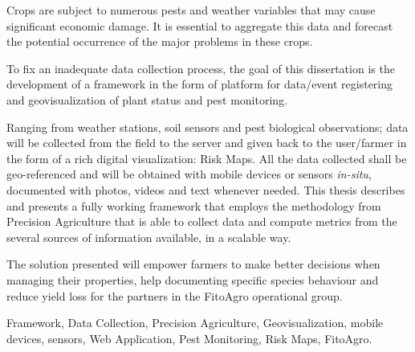 Crops are subject to numerous pests and weather variables that may cause significant economic damage. It is essential to aggregate this data and forecast the potential occurrence of the major problems in these crops. 

To fix an inadequate data collection process, the goal of this dissertation is the development of a framework in the form of platform for data/event registering and geovisualization of plant status and pest monitoring.

Ranging from weather stations, soil sensors and pest biological observations; data will be collected from the field to the server and given back to the user/farmer in the form of a rich digital visualization: Risk Maps. All the data collected shall be geo-referenced and will be obtained with mobile devices or sensors \emph{in-situ}, documented with photos, videos and text whenever needed.
This thesis describes and presents a fully working framework that employs the methodology from Precision Agriculture that is able to collect data and compute metrics from the several sources of information available, in a scalable way.

The solution presented will empower farmers to make better decisions when managing their properties, help documenting specific species behaviour and reduce yield loss for the partners in the FitoAgro operational group.

\begin{keywords}
Framework, Data Collection, Precision Agriculture, Geovisualization, mobile devices, sensors, Web Application, Pest Monitoring, Risk Maps, FitoAgro.
\end{keywords} 
